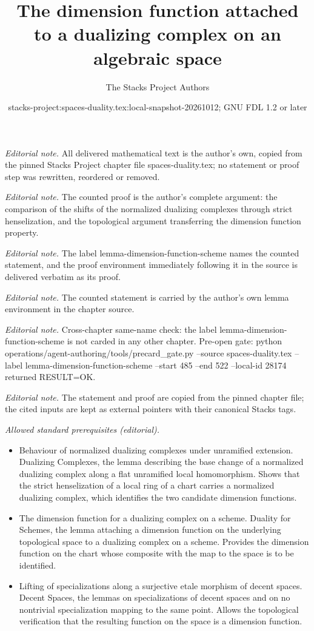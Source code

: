 \documentclass[10pt,a4paper]{amsart}
\title{The dimension function attached to a dualizing complex on an algebraic space}
\author{The Stacks Project Authors}
\date{stacks-project:spaces-duality.tex:local-snapshot-20261012; GNU FDL 1.2 or later}
\theoremstyle{plain}
\theoremstyle{definition}
\theoremstyle{remark}
\numberwithin{equation}{subsection}
\begin{document}
\maketitle
\noindent\textit{Editorial note.} All delivered mathematical text is the author's own, copied from the pinned Stacks Project chapter file spaces-duality.tex; no statement or proof step was rewritten, reordered or removed.\par\medskip
\noindent\textit{Editorial note.} The counted proof is the author's complete argument: the comparison of the shifts of the normalized dualizing complexes through strict henselization, and the topological argument transferring the dimension function property.\par\medskip
\noindent\textit{Editorial note.} The label lemma-dimension-function-scheme names the counted statement, and the proof environment immediately following it in the source is delivered verbatim as its proof.\par\medskip
\noindent\textit{Editorial note.} The counted statement is carried by the author's own lemma environment in the chapter source.\par\medskip
\noindent\textit{Editorial note.} Cross-chapter same-name check: the label lemma-dimension-function-scheme is not carded in any other chapter. Pre-open gate: python operations/agent-authoring/tools/precard\_gate.py --source spaces-duality.tex --label lemma-dimension-function-scheme --start 485 --end 522 --local-id 28174 returned RESULT=OK.\par\medskip
\noindent\textit{Editorial note.} The statement and proof are copied from the pinned chapter file; the cited inputs are kept as external pointers with their canonical Stacks tags.\par\medskip
\noindent\textit{Allowed standard prerequisites (editorial).}\begin{itemize}
\item Behaviour of normalized dualizing complexes under unramified extension. Dualizing Complexes, the lemma describing the base change of a normalized dualizing complex along a flat unramified local homomorphism. Shows that the strict henselization of a local ring of a chart carries a normalized dualizing complex, which identifies the two candidate dimension functions.
\item The dimension function for a dualizing complex on a scheme. Duality for Schemes, the lemma attaching a dimension function on the underlying topological space to a dualizing complex on a scheme. Provides the dimension function on the chart whose composite with the map to the space is to be identified.
\item Lifting of specializations along a surjective etale morphism of decent spaces. Decent Spaces, the lemmas on specializations of decent spaces and on no nontrivial specialization mapping to the same point. Allows the topological verification that the resulting function on the space is a dimension function.
\end{itemize}\medskip
\end{document}
